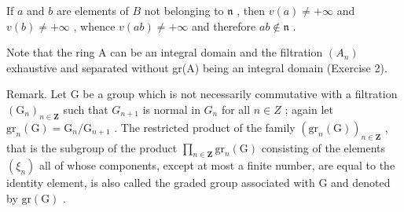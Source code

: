 If \(a\) and \(b\) are elements of \(B\) not belonging to \(\mathfrak{n}\) , then \(v(a) \neq +\infty\) and \(v(b) \neq +\infty\) , whence \(v(ab) \neq +\infty\) and therefore \(ab \notin \mathfrak{n}\) .

Note that the ring A can be an integral domain and the filtration \((A_{n})\) exhaustive and separated without gr(A) being an integral domain (Exercise 2).

Remark. Let G be a group which is not necessarily commutative with a filtration \((\mathrm{G}_{n})_{n\in\mathbf{Z}}\) such that \(G_{n+1}\) is normal in \(G_{n}\) for all \(n\in Z\) ; again let \(\mathrm{gr}_{n}(\mathrm{G})=\mathrm{G}_{n}/\mathrm{G}_{n+1}\) . The restricted product of the family \((\mathrm{gr}_{n}(\mathrm{G}))_{n\in\mathbf{Z}}\) , that is the subgroup of the product \(\prod_{n\in\mathbf{Z}}\mathrm{gr}_{n}(\mathrm{G})\) consisting of the elements \((\xi_{n})\) all of whose components, except at most a finite number, are equal to the identity element, is also called the graded group associated with G and denoted by \(\mathrm{gr}(\mathrm{G})\) .


